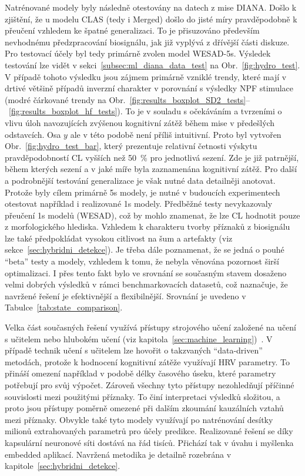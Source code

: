 Natrénované modely byly následně otestovány na datech z mise DIANA. Došlo k
zjištění, že u modelu CLAS (tedy i Merged) došlo do jisté míry pravděpodobně k
přeučení vzhledem ke špatné generalizaci. To je přisuzováno především nevhodnému
předzpracování biosignálu, jak již vyplývá z dřívější části diskuze. Pro
testovací účely byl tedy primárně zvolen model WESAD-5s. Výsledek testování lze
vidět v sekci~\ref{subsec:ml_diana_data_test} na Obr.~\ref{fig:hydro_test}. V
případě tohoto výsledku jsou zájmem primárně vzniklé trendy, které mají v drtivé
většině případů inverzní charakter v porovnání s výsledky \gls{NPF} stimulace
(modré čárkované trendy na
Obr.~\ref{fig:results_boxplot_SD2_tests}--~\ref{fig:results_boxplot_hf_tests}).
To je v souladu s očekáváním a tvrzeními o vlivu úloh navozujících zvýšenou
kognitivní zátěž během mise v předešlých odstavcích. Osa $y$ ale v této podobě
není příliš intuitivní. Proto byl vytvořen Obr.~\ref{fig:hydro_test_bar}, který
prezentuje relativní četnosti výskytu pravděpodobností \gls{CL} vyšších než
50~\% pro jednotlivá sezení. Zde je již patrnější, během kterých sezení a v jaké
míře byla zaznamenána kognitivní zátěž. Pro další a podrobnější testování
generalizace je však nutné data detailněji anotovat. Protože byly cílem primárně
5s modely, je nutné v budoucích experimentech otestovat například i realizované
1s modely. Předběžné testy nevykazovaly přeučení 1s modelů (WESAD), což by mohlo
znamenat, že lze \gls{CL} hodnotit pouze z morfologického hlediska. Vzhledem k
charakteru tvorby příznaků z biosignálu lze také předpokládat vysokou citlivost
na šum a artefakty (viz sekce~\ref{sec:hybridni_detekce}). Je třeba dále
poznamenat, že se jedná o pouhé \enquote{beta} testy a modely, vzhledem k tomu,
že nebyla věnována pozornost širší optimalizaci. I přes tento fakt bylo ve
srovnání se současným stavem dosaženo velmi dobrých výsledků v rámci
benchmarkovacích datasetů, což naznačuje, že navržené řešení je efektivnější a
flexibilnější. Srovnání je uvedeno v Tabulce~\ref{tab:state_comparison}.

Velka část současných řešení využívá přístupy strojového učení založené na učení
s učitelem nebo hlubokém učení (viz
kapitola~\ref{sec:machine_learning})~\cite{Ishaque2021}. V případě technik učení
s učitelem lze hovořit o takzvaných \enquote{data-driven} metodách, protože k
hodnocení kognitivní zátěže využívají \gls{HRV} parametry. To přináší omezení
například v podobě délky časového úseku, které parametry potřebují pro svůj
výpočet. Zároveň všechny tyto přístupy nezohledňují příčinné souvislosti mezi
použitými příznaky. To činí interpretaci výsledků složitou, a proto jsou
přístupy poměrně omezené při dalším zkoumání kauzálních vztahů mezi příznaky.
Obvykle také tyto modely využívají po natrénování desítky milionů extrahovaných
parametrů pro účely predikce. Realizované řešení se díky kapsulární neuronové
síti dostává na řád tisíců. Přichází tak v úvahu i myšlenka embedded aplikací.
Navržená metodika je detailně rozebrána v kapitole~\ref{sec:hybridni_detekce}.